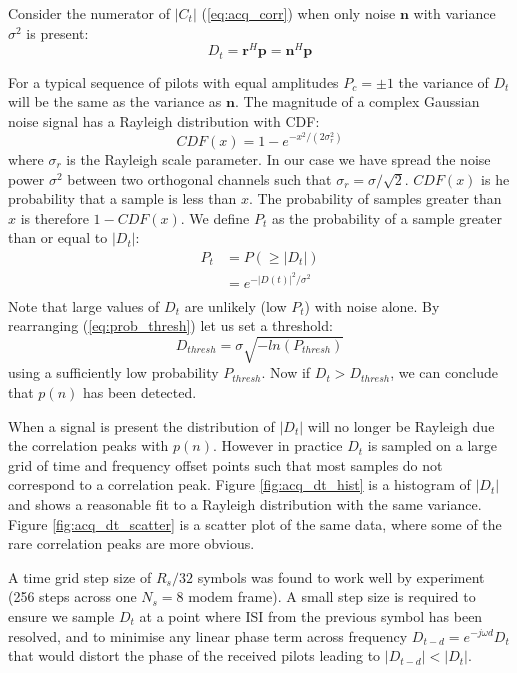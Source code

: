 \documentclass{article}
\begin{document}
Consider the numerator of $|C_t|$ (\ref{eq:acq_corr}) when only noise $\bm{n}$ with variance $\sigma^2$ is present:
\begin{equation}
D_t = \bm{r}^H\bm{p} = \bm{n}^H\bm{p}
\end{equation}

For a typical sequence of pilots with equal amplitudes $P_c=\pm1$ the variance of $D_t$ will be the same as the variance as $\bm{n}$.  The magnitude of a complex Gaussian noise signal has a Rayleigh distribution \cite{rayleigh} with CDF:
\begin{equation}
CDF(x) = 1 - e^{-x^2/(2 \sigma_r^2)}
\end{equation}
where $\sigma_r$ is the Rayleigh scale parameter.  In our case we have spread the noise power $\sigma^2$ between two orthogonal channels such that $\sigma_r = \sigma/\sqrt{2}$. $CDF(x)$ is he probability that a sample is less than $x$.  The probability of samples greater than $x$ is therefore $1-CDF(x)$.  We define $P_t$ as the probability of a sample greater than or equal to $|D_t|$: 
\begin{equation}
\label{eq:prob_thresh}
\begin{split}
P_t &= P(\ge|D_t|) \\
    &= e^{-|D(t)|^2/\sigma^2} \\
\end{split}
\end{equation}
Note that large values of $D_t$ are unlikely (low $P_t$) with noise alone. By rearranging (\ref{eq:prob_thresh}) let us set a threshold:
\begin{equation}
\label{eq:corr_prob}
D_{thresh} = \sigma\sqrt{-ln(P_{thresh})}
\end{equation}
using a sufficiently low probability $P_{thresh}$. Now if $D_t > D_{thresh}$, we can conclude that $p(n)$ has been detected.  

When a signal is present the distribution of $|D_t|$ will no longer be Rayleigh due the correlation peaks with $p(n)$. However in practice $D_t$ is sampled on a large grid of time and frequency offset points such that most samples do not correspond to a correlation peak.  Figure \ref{fig:acq_dt_hist} is a histogram of $|D_t|$ and shows a reasonable fit to a Rayleigh distribution with the same variance.  Figure \ref{fig:acq_dt_scatter} is a scatter plot of the same data, where some of the rare correlation peaks are more obvious.

A time grid step size of $R_s/32$ symbols was found to work well by experiment (256 steps across one $N_s=8$ modem frame).  A small step size is required to ensure we sample $D_t$ at a point where ISI from the previous symbol has been resolved, and to minimise any linear phase term across frequency $D_{t-d} = e^{-j \omega d}D_t$ that would distort the phase of the received pilots leading to $|D_{t-d}| < |D_t|$.
\end{document}
